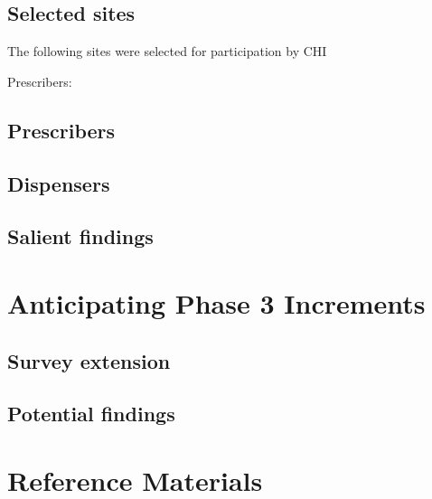 \documentclass[10,letterpaperpaper,]{article}
\begin{document}
\subsection{Selected sites}

The following sites were selected for participation by CHI

Prescribers:

\subsection{Prescribers}

\subsection{Dispensers}

\subsection{Salient findings}

\section{Anticipating Phase 3 Increments}

\subsection{Survey extension}

\subsection{Potential findings}

\section{Reference Materials}
\end{document}
